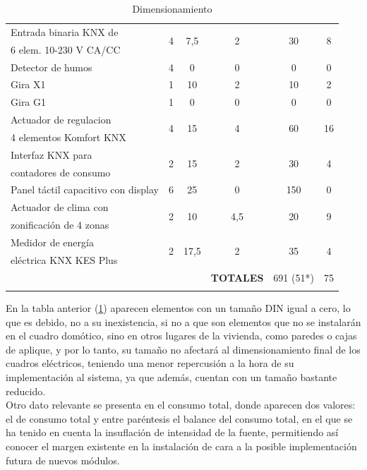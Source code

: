 \begin{flushleft}
\begin{longtable}[H]{|p{4cm}|c|c|c|c|c|}
\hline
\rule[0mm]{0mm}{4mm}
Entrada binaria KNX de &  \multirow{2}{*}{4} &  \multirow{2}{*}{7,5} &  \multirow{2}{*}{2} &  \multirow{2}{*}{30} &  \multirow{2}{*}{8}\\
 6 elem. 10-230 V CA/CC & & & & &\\
\hline
\rule[0mm]{0mm}{4mm}
 Detector de humos & 4 & 0  & 0 & 0 & 0\\
\hline
\rule[0mm]{0mm}{4mm}
Gira X1 & 1 & 10 & 2 & 10 & 2\\
\hline
\rule[0mm]{0mm}{4mm}
Gira G1 & 1 & 0 & 0 & 0 & 0\\
\hline
\rule[0mm]{0mm}{4mm}
Actuador de regulacion  &  \multirow{2}{*}{4} &  \multirow{2}{*}{15} &  \multirow{2}{*}{4} &  \multirow{2}{*}{60} &  \multirow{2}{*}{16}\\
4 elementos Komfort KNX & & & & &\\
\hline
\rule[0mm]{0mm}{4mm}
Interfaz KNX para &  \multirow{2}{*}{2} &  \multirow{2}{*}{15} &  \multirow{2}{*}{2} & \multirow{2}{*}{30} & \multirow{2}{*}{4}\\
contadores de consumo  & & & & &\\
\hline
\rule[0mm]{0mm}{4mm}
Panel táctil capacitivo con display & 6 & 25 & 0 & 150 & 0\\
\hline
\rule[0mm]{0mm}{4mm}
Actuador de clima con &\multirow{2}{*}{2} & \multirow{2}{*}{10} & \multirow{2}{*}{4,5} & \multirow{2}{*}{20} & \multirow{2}{*}{9}\\
zonificación de 4 zonas   & & & & &\\
\hline
\rule[0mm]{0mm}{4mm}
Medidor de energía  & \multirow{2}{*}{2} & \multirow{2}{*}{17,5} & \multirow{2}{*}{2} & \multirow{2}{*}{35} & \multirow{2}{*}{4} \\
eléctrica KNX KES Plus & & & & &\\
\hline
\hline
\rule[0mm]{0mm}{4mm}
 & & &\textbf{TOTALES}&691 (51*)&75\\
\hline
\caption{Dimensionamiento}
\label{tab:tabla_dimensionamiento}
\end{longtable}
\end{flushleft}

En la tabla anterior (\ref{tab:tabla_dimensionamiento}) aparecen elementos con un tamaño DIN igual a cero, lo que es debido, no a su inexistencia, si no a que son elementos que no se instalarán en el cuadro domótico, sino en otros lugares de la vivienda, como paredes o cajas de aplique, y por lo tanto, su tamaño no afectará al dimensionamiento final de los cuadros eléctricos, teniendo una menor repercusión a la hora de su implementación al sistema, ya que además, cuentan con un tamaño bastante reducido.\\
Otro dato relevante se presenta en el consumo total, donde aparecen dos valores: el de consumo total y entre paréntesis el balance del consumo total, en el que se ha tenido en cuenta la insuflación de intensidad de la fuente, permitiendo así conocer el margen existente en la instalación de cara a la posible implementación futura de nuevos módulos.

